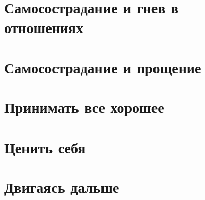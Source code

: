 \documentclass[a4paper,12pt]{report}
\begin{document}
\chapter{Самосострадание и гнев в отношениях}
\chapter{Самосострадание и прощение}
\chapter{Принимать все хорошее}
\chapter{Ценить себя}
\chapter{Двигаясь дальше}
\end{document}
